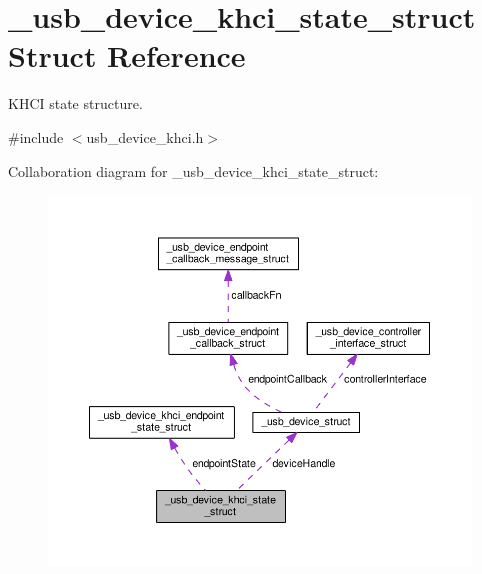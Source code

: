 \hypertarget{struct__usb__device__khci__state__struct}{\section{\-\_\-usb\-\_\-device\-\_\-khci\-\_\-state\-\_\-struct Struct Reference}
\label{struct__usb__device__khci__state__struct}
}


K\-H\-C\-I state structure.  




{\ttfamily \#include $<$usb\-\_\-device\-\_\-khci.\-h$>$}



Collaboration diagram for \-\_\-usb\-\_\-device\-\_\-khci\-\_\-state\-\_\-struct\-:
\nopagebreak
\begin{figure}[H]
\begin{center}
\leavevmode
\includegraphics[width=350pt]{struct__usb__device__khci__state__struct__coll__graph}
\end{center}
\end{figure}
